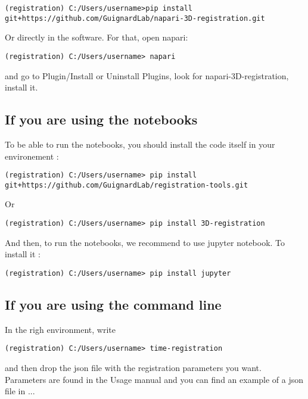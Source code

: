 \documentclass[11pt]{article}
\begin{document}
\begin{itemize}
\begin{Verbatim}[breaklines=true]
(registration) C:/Users/username>pip install git+https://github.com/GuignardLab/napari-3D-registration.git
\end{Verbatim}
Or directly in the software. For that, open napari:
\begin{verbatim}
(registration) C:/Users/username> napari
\end{verbatim}
and  go to Plugin/Install or Uninstall Plugins, look for napari-3D-registration, install it. \\

\subsection{If you are using the notebooks}
To be able to run the notebooks, you should install the code itself in your environement :
\begin{Verbatim}[breaklines=true]
(registration) C:/Users/username> pip install git+https://github.com/GuignardLab/registration-tools.git
\end{Verbatim}
Or
\begin{verbatim}
(registration) C:/Users/username> pip install 3D-registration
\end{verbatim}
And then, to run the notebooks, we recommend to use jupyter notebook. To install it :
\begin{verbatim}
(registration) C:/Users/username> pip install jupyter
\end{verbatim}

\subsection{If you are using the command line}
In the righ environment, write
\begin{verbatim}
(registration) C:/Users/username> time-registration
\end{verbatim}
and then drop the json file with the registration parameters you want. Parameters are found in the Usage manual and you can find an example of a json file in ...


\end{itemize}
\end{document}
